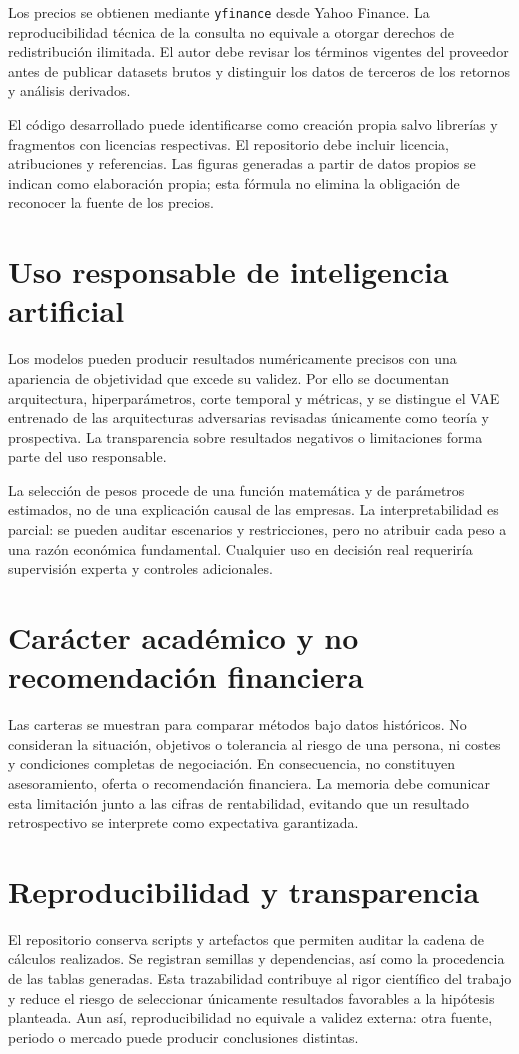 Los precios se obtienen mediante \texttt{yfinance} desde Yahoo Finance. La reproducibilidad técnica de la consulta no equivale a otorgar derechos de redistribución ilimitada. El autor debe revisar los términos vigentes del proveedor antes de publicar datasets brutos y distinguir los datos de terceros de los retornos y análisis derivados.

El código desarrollado puede identificarse como creación propia salvo librerías y fragmentos con licencias respectivas. El repositorio debe incluir licencia, atribuciones y referencias. Las figuras generadas a partir de datos propios se indican como elaboración propia; esta fórmula no elimina la obligación de reconocer la fuente de los precios.

\section{Uso responsable de inteligencia artificial}

Los modelos pueden producir resultados numéricamente precisos con una apariencia de objetividad que excede su validez. Por ello se documentan arquitectura, hiperparámetros, corte temporal y métricas, y se distingue el VAE entrenado de las arquitecturas adversarias revisadas únicamente como teoría y prospectiva. La transparencia sobre resultados negativos o limitaciones forma parte del uso responsable.

La selección de pesos procede de una función matemática y de parámetros estimados, no de una explicación causal de las empresas. La interpretabilidad es parcial: se pueden auditar escenarios y restricciones, pero no atribuir cada peso a una razón económica fundamental. Cualquier uso en decisión real requeriría supervisión experta y controles adicionales.

\section{Carácter académico y no recomendación financiera}

Las carteras se muestran para comparar métodos bajo datos históricos. No consideran la situación, objetivos o tolerancia al riesgo de una persona, ni costes y condiciones completas de negociación. En consecuencia, no constituyen asesoramiento, oferta o recomendación financiera. La memoria debe comunicar esta limitación junto a las cifras de rentabilidad, evitando que un resultado retrospectivo se interprete como expectativa garantizada.

\section{Reproducibilidad y transparencia}

El repositorio conserva scripts y artefactos que permiten auditar la cadena de cálculos realizados. Se registran semillas y dependencias, así como la procedencia de las tablas generadas. Esta trazabilidad contribuye al rigor científico del trabajo y reduce el riesgo de seleccionar únicamente resultados favorables a la hipótesis planteada. Aun así, reproducibilidad no equivale a validez externa: otra fuente, periodo o mercado puede producir conclusiones distintas.
